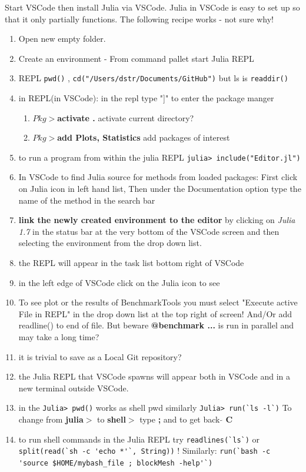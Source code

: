 Start VSCode then install Julia via VSCode. Julia in VSCode is easy to set up so that it only partially functions. The following recipe works - not sure why!
\begin{enumerate}
\item Open new empty folder.
\item Create an environment - From command pallet start Julia REPL
\item REPL \verb|pwd()| , \verb|cd("/Users/dstr/Documents/GitHub")| but ls is  \verb|readdir()|
\item in REPL(in VSCode): in the repl type "]" to enter the package manger
   \begin{enumerate}
      \item $Pkg>${\bf activate .}  activate current directory?
      \item $Pkg>${\bf add Plots, Statistics}    add packages of interest
      
   \end{enumerate}
   \item to run a program from within the julia REPL \verb|julia> include("Editor.jl")|
   \item In VSCode to find Julia source for methods from loaded packages: First click on Julia icon in left hand list, Then under the Documentation option type the name of the method in the search bar
 \item {\bf link the newly created environment to the editor} by clicking on \emph{Julia 1.7} in the status bar at the very bottom of the VSCode screen and then selecting the environment from the drop down list.  
 \item the REPL will appear in the task list bottom right of VSCode
 \item in the left edge of VSCode click on the Julia icon to see 
 \item To see plot or the results of BenchmarkTools  you must select "Execute active File in REPL"  in the drop down list at the top right of screen! And/Or  add readline() to end of file. But beware {\bf @benchmark ...} is run in parallel and may take a long time?
 \item it is trivial to save as a Local Git repository?
 
 \item  the Julia REPL that VSCode spawns will appear both in VSCode and in a new terminal outside VSCode. 
 
\item in the \verb|Julia> pwd()| works as shell pwd similarly \verb|Julia> run(`ls -l`)|  To change from {\bf julia$>$} to {\bf shell$>$} type {\bf ;} and to get back {\bf $\tilde{ }$ C}

\item to run shell commands in the Julia REPL try  \verb|readlines(`ls`)| or \newline \verb|split(read(`sh -c 'echo *'`, String))|  ! Similarly: \newline
\verb|run(`bash -c 'source $HOME/mybash_file ; blockMesh -help'`)|
\end{enumerate}


